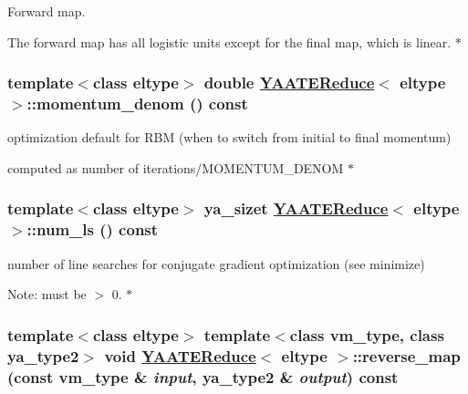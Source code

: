 Forward map. 

The forward map has all logistic units except for the final map, which is linear. $\ast$ \hypertarget{class_y_a_a_t_e_reduce_a30}{
\subsubsection[momentum\_\-denom]{\setlength{\rightskip}{0pt plus 5cm}template$<$class eltype$>$ double \hyperlink{class_y_a_a_t_e_reduce}{YAATEReduce}$<$ eltype $>$::momentum\_\-denom () const}}
\label{class_y_a_a_t_e_reduce_a30}


optimization default for RBM (when to switch from initial to final momentum) 

computed as number of iterations/MOMENTUM\_\-DENOM $\ast$ \hypertarget{class_y_a_a_t_e_reduce_a31}{
\subsubsection[num\_\-ls]{\setlength{\rightskip}{0pt plus 5cm}template$<$class eltype$>$ ya\_\-sizet \hyperlink{class_y_a_a_t_e_reduce}{YAATEReduce}$<$ eltype $>$::num\_\-ls () const}}
\label{class_y_a_a_t_e_reduce_a31}


number of line searches for conjugate gradient optimization (see minimize) 

\begin{Desc}
\item[Note:]must be $>$ 0. $\ast$ \end{Desc}
\hypertarget{class_y_a_a_t_e_reduce_a15}{
\subsubsection[reverse\_\-map]{\setlength{\rightskip}{0pt plus 5cm}template$<$class eltype$>$ template$<$class vm\_\-type, class ya\_\-type2$>$ void \hyperlink{class_y_a_a_t_e_reduce}{YAATEReduce}$<$ eltype $>$::reverse\_\-map (const vm\_\-type \& {\em input}, ya\_\-type2 \& {\em output}) const}}
\label{class_y_a_a_t_e_reduce_a15}


